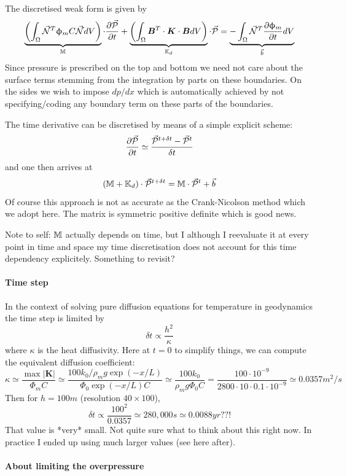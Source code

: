 The discretised weak form is given by
\[
\underbrace{
\left( \int_\Omega \vec{{\mathcal{N}}}^T \upphi_m C  \vec{{\mathcal{N}}} dV  \right)
}_{{\mathbb{M}}}
 \cdot \frac{\partial \vec{\cal P}}{\partial t}
+
\underbrace{
\left( \int_\Omega {\bm B}^T \cdot  {\bm K} \cdot {\bm B} dV \right)
}_{{{\mathbb{K}}}_d}
 \cdot \vec{\cal P}
=
\underbrace{
-
\int_\Omega \vec{{\mathcal{N}}}^T  \frac{\partial \upphi_m}{\partial t} dV
}_{\vec{b}}
\]
Since pressure is prescribed on the top and bottom we need not 
care about the surface terms stemming from the integration by parts on these boundaries. 
On the sides we wish to impose $dp/dx$ which is automatically achieved 
by not specifying/coding any boundary term on these parts of the boundaries.

The time derivative can be discretised by means of a simple explicit scheme:
\[
\frac{\partial \vec{\cal P}}{\partial t} \simeq
\frac{ \vec{\cal P}^{t+\delta t} - \vec{\cal P}^t  }{\delta t}
\]
and one then arrives at 
\[
( {{\mathbb{M}}} + {{\mathbb{K}}}_d) \cdot \vec{\cal P}^{t+\delta t} = {{\mathbb{M}}} \cdot \vec{\cal P}^t  + \vec{b}
\]
Of course this approach is not as accurate as the Crank-Nicolson method which we adopt here.
The matrix is symmetric positive definite which is good news.

Note to self: ${\mathbb{M}}$ actually depends on time, but I although I reevaluate it 
at every point in time and space my time discretisation does not account for this 
time dependency explicitely. Something to revisit?


\paragraph{Time step}
In the context of solving pure diffusion equations for temperature in geodynamics 
the time step is limited by 
\[
\delta t \propto \frac{h^2}{\kappa}
\]
where $\kappa$ is the heat diffusivity.
Here at $t=0$ to simplify things, we can compute the equivalent diffusion coefficient:
\[
\kappa \simeq \frac{\max|{\bm K}|}{\Phi_m C} 
\simeq \frac{ 100 k_0/\rho_m g \exp(-x/L) }{\Phi_0 \exp (-x/L) C}
\simeq \frac{ 100 k_0   }{\rho_m g \Phi_0  C}
= \frac{100 \cdot 10^{-9}}{2800 \cdot 10 \cdot 0.1 \cdot 10^{-9}} \simeq 0.0357 m^2/s
\]
Then for $h=100m$ (resolution $40\times 100$), 
\[
\delta t \propto  \frac{100^2}{0.0357} \simeq 280,000 s \simeq 0.0088 yr??!
\]
That value is *very* small. Not quite sure what to think about this right now.
In practice I ended up using much larger values (see here after).

\paragraph{About limiting the overpressure}

